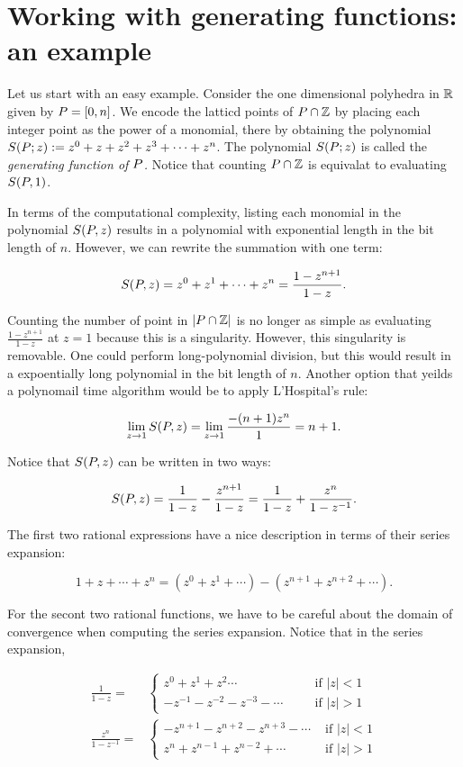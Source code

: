 \section{Working with generating functions: an example}
 
 Let us start with an easy example. Consider the one dimensional polyhedra in ${\mathbb R}$ given by ${ P} = [0, n]$. We encode the latticd points of ${ P} \cap {\mathbb Z}$ by placing each integer point as the power of a monomial, there by obtaining the polynomial $S({ P}; z) := z^0 + z + z^2 + z^3 + \cdots + z^n$. The polynomial $S({ P}; z)$ is called the \emph{generating function of ${ P}$.} Notice that counting ${ P} \cap {\mathbb Z}$ is equivalat to evaluating $S({ P}, 1)$.
 
 In terms of the computational complexity, listing each monomial in the polynomial $S({ P}, z)$ results in a polynomial with exponential length in the bit length of $n$. However, we can rewrite the summation with one term:
 
 \[ S({ P}, z) = z^0 + z^1 + \cdots + z^n = \frac{1-z^{n+1}}{1-z}.\]

Counting the number of point in $|{ P} \cap {\mathbb Z}|$ is no longer as simple as evaluating $\frac{1-z^{n+1}}{1-z}$ at $z=1$ because this is a singularity. However, this singularity is removable. One could perform long-polynomial division, but this would result in a expoentially long polynomial in the bit length of $n$. Another option that yeilds a polynomail time algorithm would be to apply L'Hospital's rule:

\[\lim_{z \rightarrow 1} S({ P}, z) = \lim_{z \rightarrow 1} \frac{-(n+1)z^{n}}{1} = n+1. \]

Notice that $S({ P}, z)$ can be written in two ways:

\[ S({ P}, z) = \frac{1}{1-z} - \frac{z^{n+1}}{1-z} = \frac{1}{1-z} + \frac{z^n}{1-z^{-1}}.\]

The first two rational expressions have a nice description in terms of their series expansion:

\[ 1+z + \cdots + z^n = (z^0 + z^1 + \cdots ) -  (z^{n+1} + z^{n+2} + \cdots).\]

For the secont two rational functions, we have to be careful about the domain of convergence when computing the series expansion. Notice that in the series expansion,

\begin{align*}
\frac{1}{1-z} =& \begin{cases} 
      z^0 + z^1 + z^2 \cdots & \;\;\;\;\; \text{ if } |z| < 1 \\
      -z^{-1} -z^{-2} - z^{-3} - \cdots & \;\;\;\;\; \text{ if }  |z| > 1 
   \end{cases} \\
\frac{z^n}{1-z^{-1}} =& \begin{cases} 
		-z^{n+1} - z^{n+2} - z^{n+3} -\cdots & \text{ if } |z| < 1 \\
      z^{n} + z^{n-1} + z^{n-2} + \cdots & \text{ if }  |z| > 1 
   \end{cases} \\
\end{align*}


